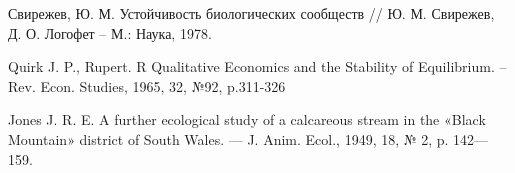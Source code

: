 \begin{thebibliography}{9}
        Свирежев, Ю. М. Устойчивость биологических сообществ // Ю. М. Свирежев, Д. О. Логофет -- М.: Наука, 1978.
    
        Quirk J. P., Rupert. R Qualitative Economics and the Stability of Equilibrium. -- Rev. Econ. Studies, 1965, 32, №92, p.311-326

        Jones J. R. E. A further ecological study of a calcareous stream in the «Black Mountain» district of South Wales. — J. Anim. Ecol., 1949, 18, № 2, p. 142—159.


\end{thebibliography}
